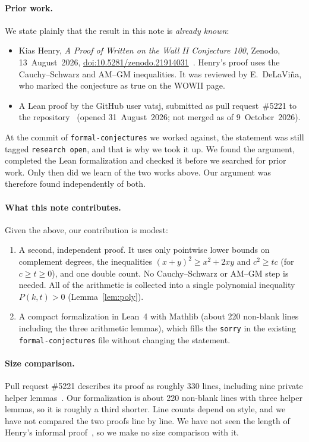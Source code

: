 \documentclass[11pt]{article}
\theoremstyle{definition}
\theoremstyle{remark}
\begin{document}
\paragraph{Prior work.}
We state plainly that the result in this note is \emph{already known}:
\begin{itemize}
\item Kias Henry, \emph{A Proof of Written on the Wall II Conjecture 100},
  Zenodo, 13~August~2026, \href{https://doi.org/10.5281/zenodo.21914031}{doi:10.5281/zenodo.21914031}~\cite{henry}.
  Henry's proof uses the Cauchy--Schwarz and AM--GM inequalities. It was
  reviewed by E.~DeLaVi\~na, who marked the conjecture as true on the WOWII
  page.
\item A Lean proof by the GitHub user vatsj, submitted as pull
  request~\#5221 to the  repository~\cite{vatsj}
  (opened 31~August~2026; not merged as of 9~October~2026).
\end{itemize}
At the commit of \texttt{formal-conjectures} we worked against, the statement
was still tagged \texttt{research open}, and that is why we took it up. We
found the argument, completed the Lean formalization and checked it before we
searched for prior work. Only then did we learn of the two works above. Our
argument was therefore found independently of both.

\paragraph{What this note contributes.}
Given the above, our contribution is modest:
\begin{enumerate}
\item A second, independent proof. It uses only pointwise lower bounds on
  complement degrees, the inequalities $(x+y)^2 \ge x^2 + 2xy$ and
  $c^2 \ge tc$ (for $c \ge t \ge 0$), and one double count. No
  Cauchy--Schwarz or AM--GM step is needed. All of the arithmetic is collected
  into a single polynomial inequality $P(k,t) > 0$ (Lemma~\ref{lem:poly}).
\item A compact formalization in Lean~4 with Mathlib (about 220 non-blank
  lines including the three arithmetic lemmas), which fills the
  \texttt{sorry} in the existing \texttt{formal-conjectures} file without
  changing the statement.
\end{enumerate}
\paragraph{Size comparison.}
Pull request \#5221 describes its proof as roughly 330 lines, including nine
private helper lemmas~\cite{vatsj}. Our formalization is about 220 non-blank
lines with three helper lemmas, so it is roughly a third shorter. Line counts
depend on style, and we have not compared the two proofs line by line. We have
not seen the length of Henry's informal proof~\cite{henry}, so we make no size
comparison with it.
\end{document}
